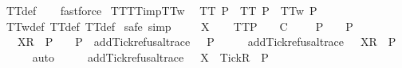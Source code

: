 \begin{isabellebody}
\ TT{}{\isacharunderscore}def\isanewline
\ \ \isamarkupfalse%
\ fastforce%
\endisatagproof
{\isafoldproof}%
%
\isadelimproof
\isanewline
%
\endisadelimproof
\isanewline
{}\isamarkupfalse%
\ TT{}{\isacharunderscore}TT{}{\isacharunderscore}imp{\isacharunderscore}TT{}w{\isacharcolon}\isanewline
\ \ {\isachardoublequoteopen}TT{}\ P\ {\isasymLongrightarrow}\ TT{}\ P\ {\isasymLongrightarrow}\ TT{}w\ P{\isachardoublequoteclose}\isanewline
%
\isadelimproof
\ \ %
\endisadelimproof
%
\isatagproof
{}\isamarkupfalse%
\ TT{}w{\isacharunderscore}def\ TT{}{\isacharunderscore}def\ TT{}{\isacharunderscore}def\isanewline
{}\isamarkupfalse%
\ {\isacharparenleft}safe{\isacharcomma}\ simp{\isacharparenright}\isanewline
\ \ \isamarkupfalse%
\ {\isasymrho}\ X\isanewline
\ \ \isamarkupfalse%
\ TT{}{\isacharunderscore}P{\isacharcolon}\ {\isachardoublequoteopen}{\isasymforall}{\isasymrho}{\isachardot}\ {\isacharparenleft}{\isasymexists}{\isasymsigma}{\isachardot}\ {\isasymrho}\ {\isasymlesssim}\isactrlsub C\ {\isasymsigma}\ {\isasymand}\ {\isasymsigma}\ {\isasymin}\ P{\isacharparenright}\ {\isasymlongrightarrow}\ {\isasymrho}\ {\isasymin}\ P{\isachardoublequoteclose}\isanewline
\ \ \isamarkupfalse%
\ {\isachardoublequoteopen}{\isasymrho}\ {\isacharat}\ {\isacharbrackleft}{\isacharbrackleft}X{\isacharbrackright}\isactrlsub R{\isacharbrackright}\ {\isasymin}\ P{\isachardoublequoteclose}\ {\isachardoublequoteopen}{\isasymforall}{\isasymrho}{\isachardot}\ {\isasymrho}\ {\isasymin}\ P\ {\isasymlongrightarrow}\ add{\isacharunderscore}Tick{\isacharunderscore}refusal{\isacharunderscore}trace\ {\isasymrho}\ {\isasymin}\ P{\isachardoublequoteclose}\isanewline
\ \ \isamarkupfalse%
\ \isamarkupfalse%
\ {\isachardoublequoteopen}add{\isacharunderscore}Tick{\isacharunderscore}refusal{\isacharunderscore}trace\ {\isacharparenleft}{\isasymrho}\ {\isacharat}\ {\isacharbrackleft}{\isacharbrackleft}X{\isacharbrackright}\isactrlsub R{\isacharbrackright}{\isacharparenright}\ {\isasymin}\ P{\isachardoublequoteclose}\isanewline
\ \ \ \ \isamarkupfalse%
\ auto\isanewline
\ \ \isamarkupfalse%
\ \isamarkupfalse%
\ {\isachardoublequoteopen}add{\isacharunderscore}Tick{\isacharunderscore}refusal{\isacharunderscore}trace\ {\isasymrho}\ {\isacharat}\ {\isacharbrackleft}{\isacharbrackleft}X\ {\isasymunion}\ {\isacharbraceleft}Tick{\isacharbraceright}{\isacharbrackright}\isactrlsub R{\isacharbrackright}\ {\isasymin}\ P{\isachardoublequoteclose}\isanewline

\end{isabellebody}
